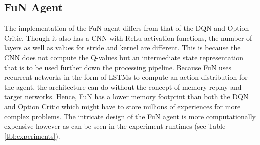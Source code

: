 \documentclass[notitlepage,a4paper,11pt]{article}
\begin{document}

\subsection{FuN Agent}
The implementation of the FuN agent differs from that of the DQN and Option Critic. Though it also has a CNN with ReLu activation functions, the number of layers as well as values for stride and kernel are different. This is because the CNN does not compute the Q-values but an intermediate state representation that is to be used further down the processing pipeline. Because FuN uses recurrent networks in the form of LSTMs to compute an action distribution for the agent, the architecture can do without the concept of memory replay and target networks. Hence, FuN has a lower memory footprint than both the DQN and Option Critic which might have to store millions of experiences for more complex problems. The intricate design of the FuN agent is more computationally expensive however as can be seen in the experiment runtimes (see Table \ref{tbl:experiments}).
\end{document}
